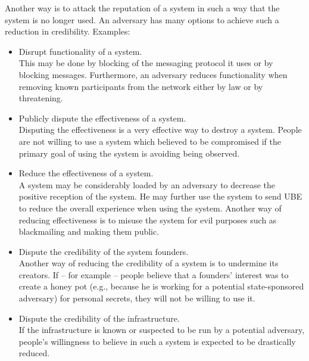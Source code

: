 Another way is to attack the reputation of a system in such a way that the system is no longer used. An adversary has many options to achieve such a reduction in credibility. Examples:
\begin{itemize}
	\item Disrupt functionality of a system.\\ 
	This may be done by blocking of the messaging protocol it uses or by blocking messages. Furthermore, an adversary reduces functionality when removing known participants from the network either by law or by threatening.
	\item Publicly dispute the effectiveness of a system.\\
	Disputing the effectiveness is a very effective way to destroy a system. People are not willing to use a system which believed to be compromised if the primary goal of using the system is avoiding being observed.
	\item Reduce the effectiveness of a system.\\
	A system may be considerably loaded by an adversary to decrease the positive reception of the system. He may further use the system to send UBE to reduce the overall experience when using the system. Another way of reducing effectiveness is to misuse the system for evil purposes such as blackmailing and making them public.
	\item Dispute the credibility of the system founders.\\
	Another way of reducing the credibility of a system is to undermine its creators. If -- for example -- people believe that a founders' interest was to create a honey pot (e.g., because he is working for a potential state-sponsored adversary) for personal secrets, they will not be willing to use it.
	\item Dispute the credibility of the infrastructure.\\
	If the infrastructure is known or suspected to be run by a potential adversary, people's willingness to believe in such a system is expected to be drastically reduced.
\end{itemize}

